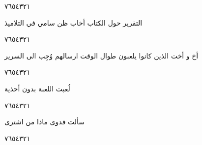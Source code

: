\documentclass[11pt, a4paper]{article}
\begin{document}
{\begin{center}
        \hfill\textarabic{٧}\hfill\textarabic{٦}\hfill\textarabic{٥}\hfill\textarabic{٤}\hfill\textarabic{٣}\hfill\textarabic{٢}\hfill\textarabic{١}
        \end{center}


\vspace{0.5\baselineskip}\begin{flushright}
\textarabic{التقرير حول الكتاب أخاب ظن سامي في التلاميذ}
\end{flushright}

\begin{center}
        \hfill\textarabic{٧}\hfill\textarabic{٦}\hfill\textarabic{٥}\hfill\textarabic{٤}\hfill\textarabic{٣}\hfill\textarabic{٢}\hfill\textarabic{١}
        \end{center}
		
\vfill\clearpage

\vspace{0.5\baselineskip}\begin{flushright}
\textarabic{أخ و أخت الذين كانوا يلعبون طوال الوقت ارسالهم وُجِب الى السرير}
\end{flushright}

\begin{center}
        \hfill\textarabic{٧}\hfill\textarabic{٦}\hfill\textarabic{٥}\hfill\textarabic{٤}\hfill\textarabic{٣}\hfill\textarabic{٢}\hfill\textarabic{١}
        \end{center}


\vspace{0.5\baselineskip}\begin{flushright}
\textarabic{لُعبت اللعبة بدون أحذية}
\end{flushright}

\begin{center}
        \hfill\textarabic{٧}\hfill\textarabic{٦}\hfill\textarabic{٥}\hfill\textarabic{٤}\hfill\textarabic{٣}\hfill\textarabic{٢}\hfill\textarabic{١}
        \end{center}


\vspace{0.5\baselineskip}\begin{flushright}
\textarabic{سألت فدوى ماذا من اشترى}
\end{flushright}

\begin{center}
        \hfill\textarabic{٧}\hfill\textarabic{٦}\hfill\textarabic{٥}\hfill\textarabic{٤}\hfill\textarabic{٣}\hfill\textarabic{٢}\hfill\textarabic{١}
        \end{center}


}
\end{document}
